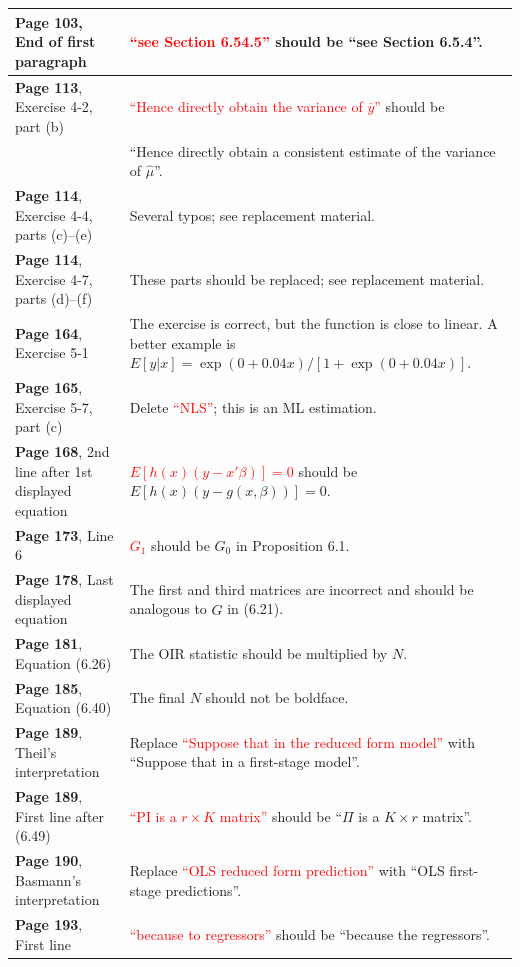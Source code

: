 \documentclass[10pt, a4paper]{article}
\newcommand{\red}[1]{\textcolor{red}{#1}}
\newcommand{\green}[1]{\textcolor{green!50!black}{#1}}
\begin{document}
\begin{longtable}{|R{.41\textwidth}|R{.57\textwidth}|}
	\textbf{Page 103}, End of first paragraph & \red{``see Section 6.54.5''} should be \green{``see Section 6.5.4''}. \\ \hline
	\textbf{Page 113}, Exercise 4-2, part (b) & \red{``Hence directly obtain the variance of $\overline{y}$''} should be \\&\green{``Hence directly obtain a consistent estimate of the variance of $\widehat{\mu}$''}. \\ \hline
	\textbf{Page 114}, Exercise 4-4, parts (c)--(e) & Several typos; see replacement material. \\ \hline
	\textbf{Page 114}, Exercise 4-7, parts (d)--(f) & These parts should be replaced; see replacement material. \\ \hline
	\textbf{Page 164}, Exercise 5-1 & The exercise is correct, but the function is close to linear. A better example is \green{$E[y|x]=\exp(0+0.04x)/[1+\exp(0+0.04x)]$}. \\ \hline
	\textbf{Page 165}, Exercise 5-7, part (c) & Delete \red{``NLS''}; this is an ML estimation. \\ \hline
	\textbf{Page 168}, 2nd line after 1st displayed equation & \red{$E[h(x)(y-x'\beta)] = 0$} should be \green{$E[h(x)(y-g(x,\beta))] = 0$}. \\ \hline
	\textbf{Page 173}, Line 6 & \red{$G_1$} should be \green{$G_0$} in Proposition 6.1. \\ \hline
	\textbf{Page 178}, Last displayed equation & The first and third matrices are incorrect and should be analogous to \green{$\widehat G$} in (6.21). \\ \hline
	\textbf{Page 181}, Equation (6.26) \hfill {} & The OIR statistic should be multiplied by \green{$N$}. \\ \hline
	\textbf{Page 185}, Equation (6.40) & The final \green{$N$} should not be boldface. \\ \hline
	\textbf{Page 189}, Theil's interpretation \hfill {} & Replace \red{``Suppose that in the reduced form model''} with \green{``Suppose that in a first-stage model''}. \\ \hline
	\textbf{Page 189}, First line after (6.49) & \red{``PI is a $r \times K$ matrix''} should be \green{``$\Pi$ is a $K \times r$ matrix''}. \\ \hline
	\textbf{Page 190}, Basmann's interpretation & Replace \red{``OLS reduced form prediction''} with \green{``OLS first-stage predictions''}. \\ \hline
	\textbf{Page 193}, First line & \red{``because to regressors''} should be \green{``because the regressors''}. \\ \hline

\end{longtable}
\end{document}
